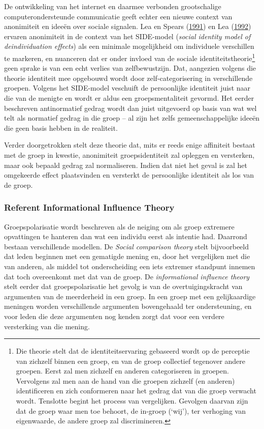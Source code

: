 \documentclass[10.5pt,dutch,]{article}
\begin{document}
De ontwikkeling van het internet en daarmee verbonden grootschalige
computerondersteunde communicatie geeft echter een nieuwe context van
anonimiteit en ideeën over sociale signalen. Lea en Spears
(\protect\hyperlink{ref-leaux5fcomputer-mediatedux5f1991}{1991}) en Lea
(\protect\hyperlink{ref-leaux5fsocialux5f1992}{1992}) ervaren
anonimiteit in de context van het SIDE-model (\emph{social identity
model of deindividuation effects}) als een minimale mogelijkheid om
individuele verschillen te markeren, en nuanceren dat er onder invloed
van de sociale identiteitstheorie\footnote{Die theorie stelt dat de
  identiteitservaring gebaseerd wordt op de perceptie van zichzelf
  binnen een groep, en van de groep collectief tegenover andere groepen.
  Eerst zal men zichzelf en anderen categoriseren in groepen. Vervolgens
  zal men aan de hand van die groepen zichzelf (en anderen)
  identificeren en zich conformeren naar het gedrag dat van die groep
  verwacht wordt. Tenslotte begint het process van vergelijken. Gevolgen
  daarvan zijn dat de groep waar men toe behoort, de in-groep (`wij'),
  ter verhoging van eigenwaarde, de andere groep zal discrimineren.}
geen sprake is van een echt verlies van zelfbewustzijn. Dat, aangezien
volgens die theorie identiteit mee opgebouwd wordt door
zelf-categorisering in verschillende groepen. Volgens het SIDE-model
veschuift de persoonlijke identiteit juist naar die van de menigte en
wordt er aldus een groepsmentaliteit gevormd. Het eerder beschreven
antinormatief gedrag wordt dan juist uitgevoerd op basis van wat wel
telt als normatief gedrag in die groep -- al zijn het zelfs
gemeenschappelijke ideeën die geen basis hebben in de realiteit.

Verder doorgetrokken stelt deze theorie dat, mits er reeds enige
affiniteit bestaat met de groep in kwestie, anonimiteit groepsidentiteit
zal opleggen en versterken, maar ook bepaald gedrag zal normaliseren.
Indien dat niet het geval is zal het omgekeerde effect plaatsvinden en
versterkt de persoonlijke identiteit als los van de groep.

\subsubsection{Referent Informational Influence
Theory}\label{referent-informational-influence-theory}

Groepspolarisatie wordt beschreven als de neiging om als groep extremere
opvattingen te hanteren dan wat een individu eerst als intentie had.
Daarrond bestaan verschillende modellen. De \emph{Social comparison
theory} stelt bijvoorbeeld dat leden beginnen met een gematigde mening
en, door het vergelijken met die van anderen, als middel tot
onderscheiding een iets extremer standpunt innemen dat toch overeenkomt
met dat van de groep. De \emph{informational influence theory} stelt
eerder dat groepspolarisatie het gevolg is van de overtuigingskracht van
argumenten van de meerderheid in een groep. In een groep met een
gelijkaardige meningen worden verschillende argumenten bovengehaald ter
ondersteuning, en voor leden die deze argumenten nog kenden zorgt dat
voor een verdere versterking van die mening.
\end{document}
